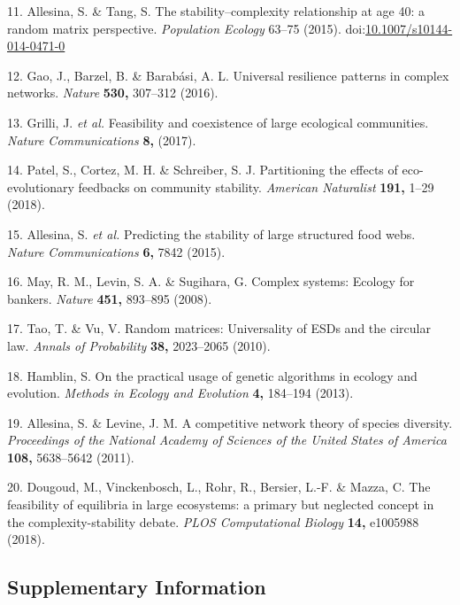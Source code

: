 \documentclass[]{article}
\begin{document}
\hypertarget{ref-Allesina2015a}{}
11. Allesina, S. \& Tang, S. The stability--complexity relationship at
age 40: a random matrix perspective. \emph{Population Ecology} 63--75
(2015).
doi:\href{https://doi.org/10.1007/s10144-014-0471-0}{10.1007/s10144-014-0471-0}

\hypertarget{ref-Gao2016}{}
12. Gao, J., Barzel, B. \& Barabási, A. L. Universal resilience patterns
in complex networks. \emph{Nature} \textbf{530,} 307--312 (2016).

\hypertarget{ref-Grilli2017}{}
13. Grilli, J. \emph{et al.} Feasibility and coexistence of large
ecological communities. \emph{Nature Communications} \textbf{8,} (2017).

\hypertarget{ref-Patel2018}{}
14. Patel, S., Cortez, M. H. \& Schreiber, S. J. Partitioning the
effects of eco-evolutionary feedbacks on community stability.
\emph{American Naturalist} \textbf{191,} 1--29 (2018).

\hypertarget{ref-Allesina2015}{}
15. Allesina, S. \emph{et al.} Predicting the stability of large
structured food webs. \emph{Nature Communications} \textbf{6,} 7842
(2015).

\hypertarget{ref-May2008}{}
16. May, R. M., Levin, S. A. \& Sugihara, G. Complex systems: Ecology
for bankers. \emph{Nature} \textbf{451,} 893--895 (2008).

\hypertarget{ref-Tao2010}{}
17. Tao, T. \& Vu, V. Random matrices: Universality of ESDs and the
circular law. \emph{Annals of Probability} \textbf{38,} 2023--2065
(2010).

\hypertarget{ref-Hamblin2013}{}
18. Hamblin, S. On the practical usage of genetic algorithms in ecology
and evolution. \emph{Methods in Ecology and Evolution} \textbf{4,}
184--194 (2013).

\hypertarget{ref-Allesina2011}{}
19. Allesina, S. \& Levine, J. M. A competitive network theory of
species diversity. \emph{Proceedings of the National Academy of Sciences
of the United States of America} \textbf{108,} 5638--5642 (2011).

\hypertarget{ref-Dougoud2018}{}
20. Dougoud, M., Vinckenbosch, L., Rohr, R., Bersier, L.-F. \& Mazza, C.
The feasibility of equilibria in large ecosystems: a primary but
neglected concept in the complexity-stability debate. \emph{PLOS
Computational Biology} \textbf{14,} e1005988 (2018).

\clearpage

\begin{center}
\hypertarget{SIstart}{\section{Supplementary Information}\label{SIstart}}
\end{center}
\end{document}
